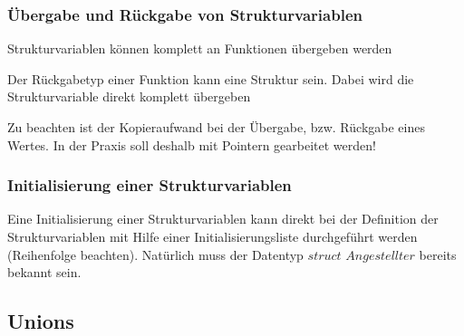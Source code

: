 		\subsubsection{Übergabe und Rückgabe von Strukturvariablen}
			\begin{compactitem}
				\item Strukturvariablen können komplett an Funktionen übergeben werden
				\item Der Rückgabetyp einer Funktion kann eine Struktur sein. Dabei wird die Strukturvariable direkt komplett übergeben
				\item Zu beachten ist der Kopieraufwand bei der Übergabe, bzw. Rückgabe eines Wertes. In der Praxis soll deshalb mit Pointern gearbeitet werden!
				 
			\end{compactitem}
		\newpage
		\subsubsection{Initialisierung einer Strukturvariablen}
			Eine Initialisierung einer Strukturvariablen kann direkt bei der Definition der Strukturvariablen mit Hilfe einer Initialisierungsliste durchgeführt werden (Reihenfolge beachten). Natürlich muss der Datentyp $struct$ $Angestellter$ bereits bekannt sein. 
			 				
	\subsection{Unions }
